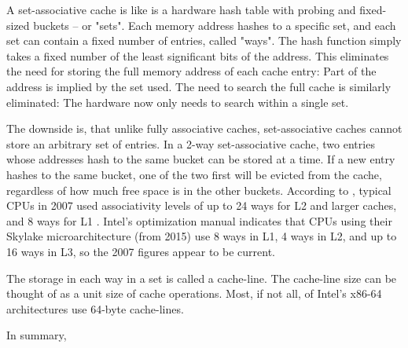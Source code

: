 A set-associative cache is like is a hardware hash table with probing and
fixed-sized buckets -- or "sets". Each memory address hashes to a specific set,
and each set can contain a fixed number of entries, called "ways". The hash
function simply takes a fixed number of the least significant bits of the
address. This eliminates the need for storing the full memory address of each
cache entry: Part of the address is implied by the set used. The need to search
the full cache is similarly eliminated: The hardware now only needs to search
within a single set.

The downside is, that unlike fully associative caches, set-associative caches
cannot store an arbitrary set of entries. In a 2-way set-associative cache, two
entries whose addresses hash to the same bucket can be stored at a time. If a
new entry hashes to the same bucket, one of the two first will be evicted from
the cache, regardless of how much free space is in the other buckets. According
to \citeauthor{whatprogrammersshouldknow}, typical CPUs in 2007 used
associativity levels of up to 24 ways for L2 and larger caches, and 8 ways for L1
\cite{whatprogrammersshouldknow}. Intel's optimization manual
\cite{inteloptimize} indicates that CPUs using their Skylake microarchitecture
(from 2015) use 8 ways in L1, 4 ways in L2, and up to 16 ways in L3, so the
2007 figures appear to be current.

The storage in each way in a set is called a cache-line. The cache-line
size can be thought of as a unit size of cache operations. Most, if not all, of
Intel's x86-64 architectures use 64-byte cache-lines\cite{inteloptimize}.

In summary, 


